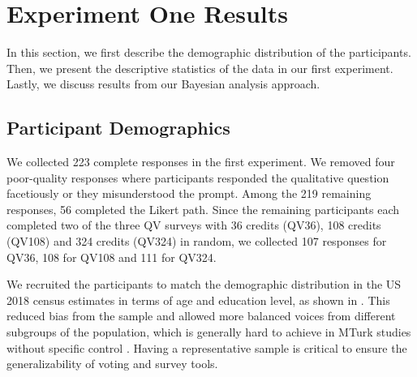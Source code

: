 \section{Experiment One Results} \label{results-1-quan}
In this section, we first describe the demographic distribution of the participants. Then, we present the descriptive statistics of the data in our first experiment. Lastly, we discuss results from our Bayesian analysis approach.

\subsection{Participant Demographics}
    
We collected 223 complete responses in the first experiment.  We removed four poor-quality responses where participants responded the qualitative question facetiously or they misunderstood the prompt. Among the 219 remaining responses, 56 completed the Likert path. Since the remaining participants each completed two of the three QV surveys with 36 credits (QV36), 108 credits (QV108) and 324 credits (QV324) in random, we collected 107 responses for QV36,  108 for QV108 and 111 for QV324. 

We recruited the participants to match the demographic distribution in the US 2018 census estimates in terms of age and education level, as shown in . This reduced bias from the sample and allowed more balanced voices from different subgroups of the population, which is generally hard to achieve in MTurk studies without specific control \cite{difallah2018demographics}. Having a representative sample is critical to ensure the generalizability of voting and survey tools. 


